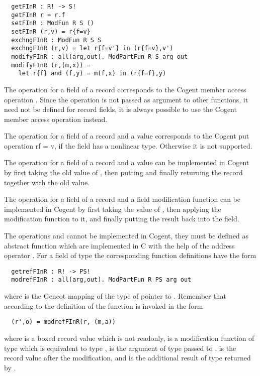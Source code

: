 \begin{verbatim}
  getFInR : R! -> S!
  getFInR r = r.f
  setFInR : ModFun R S ()
  setFInR (r,v) = r{f=v}
  exchngFInR : ModFun R S S
  exchngFInR (r,v) = let r{f=v'} in (r{f=v},v')
  modifyFInR : all(arg,out). ModPartFun R S arg out
  modifyFInR (r,(m,x)) = 
    let r{f} and (f,y) = m(f,x) in (r{f=f},y)
\end{verbatim}

The operation  for a field  of a record  corresponds to the Cogent member access operation .
Since the  operation is not passed as argument to other functions, it need not be defined for record fields, it is always possible
to use the Cogent member access operation instead.

The operation  for a field  of a record  and a value  corresponds to the Cogent put operation r{f = v}, if
the field has a nonlinear type. Otherwise it is not supported.

The operation  for a field  of a record  and a value  can be implemented in Cogent by first taking the 
old value of , then putting  and finally returning the record together with the old value.

The operation  for a field  of a record  and a field modification function can be implemented in Cogent 
by first taking the value of , then applying the modification function to it, and finally putting the result back into
the field.

The operations  and  cannot be implemented in Cogent, they must be defined as abstract function which are implemented in 
C with the help of the address operator \code{\&}. For a field  of type  the corresponding function definitions have the form
\begin{verbatim}
  getrefFInR : R! -> PS!
  modrefFInR : all(arg,out). ModPartFun R PS arg out
\end{verbatim}
where  is the Gencot mapping of the type of pointer to . Remember that according to the definition of 
 the function  is invoked in the form
\begin{verbatim}
  (r',o) = modrefFInR(r, (m,a))
\end{verbatim}
where  is a boxed record value which is not readonly,  is a modification function of type  which
is equivalent to type ,  is the argument of type  passed to ,  is
the record value  after the modification, and  is the additional result of type  returned by .

